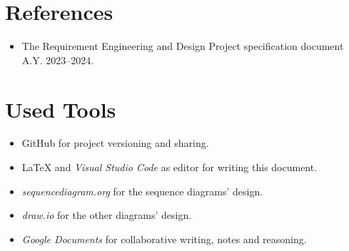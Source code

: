 \section{References}
\label{sec:references}%

\begin{itemize}
    \item The Requirement Engineering and Design Project specification document A.Y. 2023–2024. 
\end{itemize}

\section{Used Tools}
\label{sec:used_tools}%
\begin{itemize}
    \item GitHub for project versioning and sharing.
    \item \LaTeX{} and \textit{Visual Studio Code} as editor for writing this document.
    \item \textit{sequencediagram.org} for the sequence diagrams' design.
    \item \textit{draw.io} for the other diagrams' design.
    \item \textit{Google Documents} for collaborative writing, notes and reasoning.
\end{itemize}
